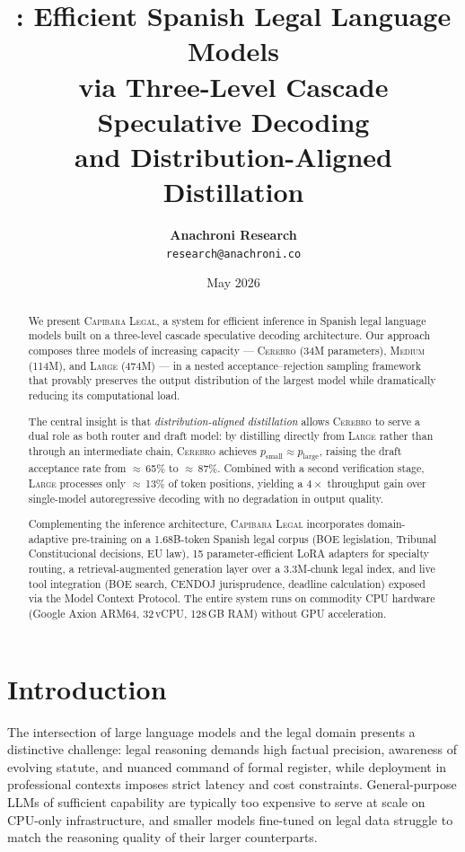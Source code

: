 \documentclass[11pt,a4paper]{article}
\title{\textbf{\modelname}: Efficient Spanish Legal Language Models\\
       via Three-Level Cascade Speculative Decoding\\
       and Distribution-Aligned Distillation}
\author{
  \textbf{Anachroni Research}\\
  \texttt{research@anachroni.co}
}
\date{May 2026}
\newcommand{\modelname}{\textsc{Capibara Legal}}
\newcommand{\cerebro}{\textsc{Cerebro}}
\begin{document}
\maketitle

\begin{abstract}
We present \modelname, a system for efficient inference in Spanish legal language
models built on a three-level cascade speculative decoding architecture. Our
approach composes three models of increasing capacity — \cerebro{} (34M
parameters), \textsc{Medium} (114M), and \textsc{Large} (474M) — in a nested
acceptance--rejection sampling framework that provably preserves the output
distribution of the largest model while dramatically reducing its computational
load.

The central insight is that \emph{distribution-aligned distillation} allows
\cerebro{} to serve a dual role as both router and draft model: by distilling
directly from \textsc{Large} rather than through an intermediate chain,
\cerebro{} achieves $p_{\mathrm{small}} \approx p_{\mathrm{large}}$, raising the
draft acceptance rate from $\approx$\,65\% to $\approx$\,87\%. Combined with a
second verification stage, \textsc{Large} processes only $\approx$\,13\% of
token positions, yielding a $4\times$ throughput gain over single-model
autoregressive decoding with no degradation in output quality.

Complementing the inference architecture, \modelname{} incorporates domain-adaptive
pre-training on a 1.68B-token Spanish legal corpus (BOE legislation, Tribunal
Constitucional decisions, EU law), 15 parameter-efficient LoRA adapters for
specialty routing, a retrieval-augmented generation layer over a 3.3M-chunk
legal index, and live tool integration (BOE search, CENDOJ jurisprudence,
deadline calculation) exposed via the Model Context Protocol. The entire system
runs on commodity CPU hardware (Google Axion ARM64, 32\,vCPU, 128\,GB RAM)
without GPU acceleration.
\end{abstract}

\section{Introduction}

The intersection of large language models and the legal domain presents a
distinctive challenge: legal reasoning demands high factual precision, awareness
of evolving statute, and nuanced command of formal register, while deployment in
professional contexts imposes strict latency and cost constraints. General-purpose
LLMs of sufficient capability are typically too expensive to serve at scale on
CPU-only infrastructure, and smaller models fine-tuned on legal data struggle to
match the reasoning quality of their larger counterparts.
\end{document}
